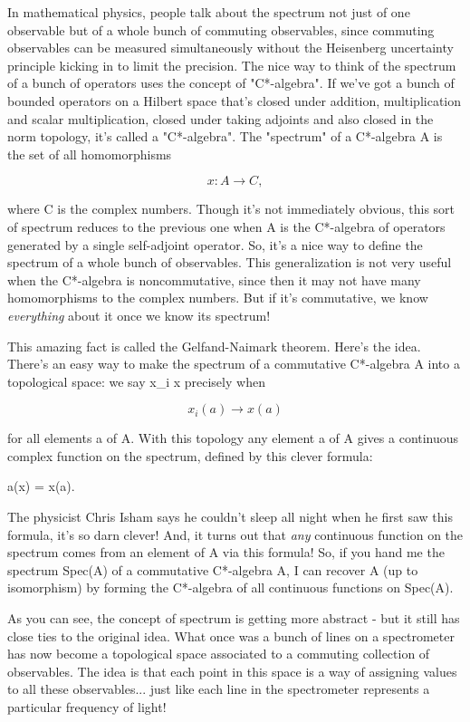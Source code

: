 In mathematical physics, people talk about the spectrum not just
of one observable but of a whole bunch of commuting observables, since
commuting observables can be measured simultaneously without the Heisenberg
uncertainty principle kicking in to limit the precision.   The nice way to 
think of the spectrum of a bunch of operators uses the concept of 
"C*-algebra".  If we've got a bunch of bounded operators on a Hilbert 
space that's closed under addition, multiplication and scalar 
multiplication, closed under taking adjoints and also closed in the 
norm topology, it's called a "C*-algebra".   The "spectrum" of a 
C*-algebra A is the set of all homomorphisms 


$$

x: A \to  C, 
$$
    
where C is the complex numbers.  Though it's not immediately obvious,
this sort of spectrum reduces to the previous one when A is the
C*-algebra of operators generated by a single self-adjoint operator.
So, it's a nice way to define the spectrum of a whole bunch of
observables.  This generalization is not very useful when the
C*-algebra is noncommutative, since then it may not have many
homomorphisms to the complex numbers.  But if it's commutative, we know
\emph{everything} about it once we know its spectrum!

This amazing fact is called the Gelfand-Naimark theorem.  Here's 
the idea.  There's an easy way to make the spectrum of a commutative
C*-algebra A into a topological space: we say x_{i} \to  x 
precisely when


$$

x_{i}(a) \to  x(a)
$$
    
for all elements a of A.  With this topology any
element a of A gives a continuous complex function on the spectrum, 
defined by this clever formula:

a(x) = x(a).

The physicist Chris Isham says he couldn't sleep all night when he
first saw this formula, it's so darn clever!  And, it turns out that
\emph{any} continuous function on the spectrum comes from an element of A
via this formula!  So, if you hand me the spectrum Spec(A) of a
commutative C*-algebra A, I can recover A (up to isomorphism) by
forming the C*-algebra of all continuous functions on Spec(A).

As you can see, the concept of spectrum is getting more abstract - but
it still has close ties to the original idea.  What once was a bunch
of lines on a spectrometer has now become a topological space
associated to a commuting collection of observables.  The idea is that
each point in this space is a way of assigning values to all these
observables... just like each line in the spectrometer represents a
particular frequency of light!

